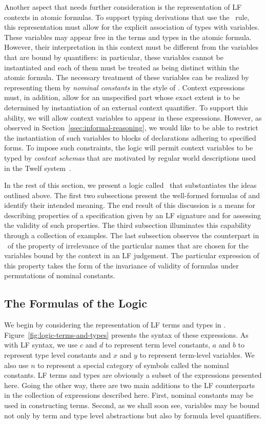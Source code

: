 Another aspect that needs further consideration is the representation of
LF contexts in atomic formulas.
%
To support typing derivations that use the
\canontermlam\ rule, this representation must allow for the explicit
association of types with variables.
%
These variables may appear free in the terms and types in the atomic
formula.
%
However, their interpretation in this context must be different from
the variables that are bound by quantifiers: in particular, these
variables cannot be instantiated and each of them must be treated as
being distinct within the atomic formula. 
%
The necessary treatment of these variables can be realized by
representing them by \emph{nominal constants} in the style of
\cite{gacek11ic,tiu06lfmtp}.
%
Context expressions must, in addition, allow for an unspecified part
whose exact extent is to be determined by instantiation of an external
context quantifier.
%
To support this ability, we will allow context variables to appear in
these expressions.
%
However, as observed in Section~\ref{ssec:informal-reasoning}, we
would like to be able to restrict the instantiation of such variables
to blocks of declarations adhering to specified forms.
%
To impose such constraints, the logic will permit context variables to
be typed by \emph{context schemas} that are motivated by regular world
descriptions used in the Twelf
system~\cite{Pfenning02guide,schurmann00phd}. 

In the rest of this section, we present a logic called \logic\ that
substantiates the ideas outlined above.
%
The first two subsections present the well-formed formulas of \logic and
identify their intended meaning. 
%
The end result of this discussion is a means for describing properties
of a specification given by an LF signature and for assessing the
validity of such properties.
%
The third subsection illuminates this capability through a
collection of examples.
%
The last subsection observes the counterpart in \logic\ of the
property of irrelevance of the particular names that are chosen for
the variables bound by the context in an LF judgement.
%
The particular expression of this property takes the form of the
invariance of validity of formulas under permutations of
nominal constants. 

\subsection{The Formulas of the Logic}

We begin by considering the representation of LF terms and types in \logic.
%
Figure~\ref{fig:logic-terms-and-types} presents the syntax of these
expressions.
%
As with LF syntax, we use $c$ and $d$ to represent term level
constants, $a$ and $b$ to represent type level constants and $x$ and
$y$ to represent term-level variables.
%
We also use $n$ to represent a special category of symbols called the
nominal constants.
%
LF terms and types are obviously a subset of the expressions presented
here.
%
Going the other way, there are two main additions to the LF
counterparts in the collection of expressions described here.
%
First, nominal constants may be used in constructing terms.
%
Second, as we shall soon see, variables may be bound not only by
term and type level abstractions but also by formula level
quantifiers.

